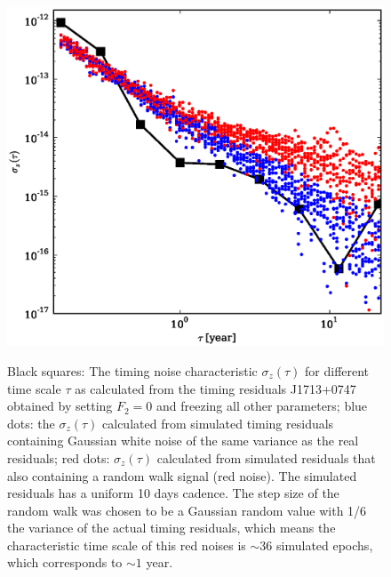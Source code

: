\documentclass[12pt,preprint]{aastex}
\begin{document}
\begin{figure}
\includegraphics[scale=0.6]{1713_TN.ps} \\ 
\caption {\label{fig:TN} Black squares: The timing noise characteristic
$\sigma_z(\tau)$ \citep{mte97} for different time scale $\tau$ as calculated
from the timing residuals J1713+0747 obtained by setting $F_2=0$ and freezing
all other parameters; blue dots:
the $\sigma_z(\tau)$ calculated from simulated timing residuals containing 
Gaussian white noise of the same variance as the real residuals; red dots:
$\sigma_z(\tau)$ calculated from simulated residuals that also containing a
random walk signal (red noise). 
The simulated residuals has a uniform 10 days cadence.
The step size of the random walk was chosen to
be a Gaussian random value with 1/6 the variance of the actual timing
residuals, which means the characteristic time scale of this red noises
is $\sim$36 simulated epochs, which corresponds to $\sim 1$ year.  
} 
\end{figure} 
\end{document}
